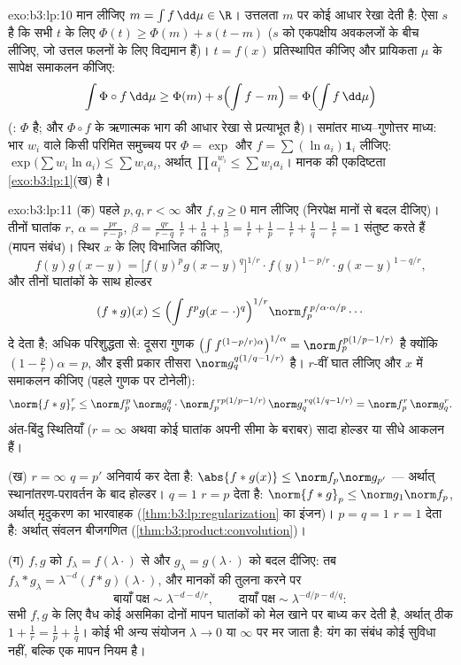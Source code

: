 \begin{solution}{exo:b3:lp:10}
मान लीजिए $m = \int f\,\dd\mu \in \R$। उत्तलता $m$ पर कोई आधार रेखा देती है: ऐसा $s$
है कि सभी $t$ के लिए $\Phi(t) \geq \Phi(m) + s(t -
m)$ ($s$ को एकपक्षीय अवकलजों के बीच लीजिए,
जो उत्तल फलनों के लिए विद्यमान हैं)। $t = f(x)$ प्रतिस्थापित कीजिए और
प्रायिकता $\mu$ के सापेक्ष समाकलन कीजिए:
\[
\int\Phi\circ f\,\dd\mu \geq \Phi(m) + s\Bigl(\int f - m\Bigr)
= \Phi\Bigl(\int f\,\dd\mu\Bigr)
\]
(: $\Phi$  है; और $\Phi\circ f$ के ऋणात्मक भाग की  आधार
रेखा से प्रत्याभूत है)। समांतर माध्य--गुणोत्तर माध्य: भार $w_i$ वाले
किसी परिमित समुच्चय पर $\Phi = \exp$ और $f = \sum(\ln a_i)\mathbf 1_i$ लीजिए: $\exp\bigl(\sum w_i\ln a_i\bigr) \leq \sum w_ia_i$, अर्थात् $\prod a_i^{w_i} \leq \sum w_ia_i$।
मानक की एकदिष्टता \cref{exo:b3:lp:1}(ख) है।
\end{solution}

\begin{solution}{exo:b3:lp:11}
(क) पहले $p, q, r < \infty$ और $f, g \geq 0$ मान लीजिए (निरपेक्ष मानों से बदल दीजिए)।
तीनों घातांक $r$, $\alpha = \frac{pr}{r-p}$, $\beta = \frac{qr}{r-q}$ $\frac1r + \frac1\alpha + \frac1\beta = \frac1r +
\frac1p - \frac1r + \frac1q - \frac1r = 1$ संतुष्ट करते हैं (मापन संबंध)।
स्थिर $x$ के लिए विभाजित कीजिए,
\[
f(y)g(x-y) = \bigl[f(y)^pg(x-y)^q\bigr]^{1/r}\cdot
f(y)^{1 - p/r}\cdot g(x-y)^{1 - q/r},
\]
और तीनों घातांकों के साथ होल्डर
\[
(f*g)(x) \leq \Bigl(\int f^pg(x-\cdot)^q\Bigr)^{1/r}
\norm f_p^{\,p/\alpha\cdot\alpha/p}\cdots
\]
दे देता है; अधिक परिशुद्धता से: दूसरा गुणक $\bigl(\int f^{(1-p/r)\alpha}\bigr)^{1/\alpha} =
\norm f_p^{p(1/p - 1/r)}$ है क्योंकि $(1 - \frac pr)\alpha = p$,
और इसी प्रकार तीसरा $\norm g_q^{q(1/q - 1/r)}$ है। $r$-वीं घात लीजिए और $x$ में समाकलन
कीजिए (पहले गुणक पर टोनेली):
\[
\norm{f*g}_r^r \leq \norm f_p^p\,\norm g_q^q\cdot
\norm f_p^{\,rp(1/p - 1/r)}\,\norm g_q^{\,rq(1/q - 1/r)}
= \norm f_p^r\,\norm g_q^r .
\]
अंत-बिंदु स्थितियाँ ($r = \infty$ अथवा कोई घातांक अपनी सीमा के बराबर) सादा
होल्डर या सीधे आकलन हैं।

(ख) $r = \infty$ $q = p'$ अनिवार्य कर देता है: $\abs{f*g(x)} \leq \norm
f_p\norm g_{p'}$ --- अर्थात् स्थानांतरण-परावर्तन
के बाद होल्डर। $q = 1$ $r = p$ देता है: $\norm{f*g}_p \leq \norm
g_1\norm f_p$, अर्थात् मृदुकरण का भारवाहक
(\cref{thm:b3:lp:regularization} का इंजन)। $p = q = 1$ $r = 1$ देता है: अर्थात् संवलन बीजगणित (\cref{thm:b3:product:convolution})।

(ग) $f, g$ को $f_\lambda = f(\lambda\cdot)$ से और $g_\lambda = g(\lambda\cdot)$ को बदल दीजिए: तब $f_\lambda*g_\lambda =
\lambda^{-d}(f*g)(\lambda\cdot)$, और मानकों
की तुलना करने पर
\[
\text{बायाँ पक्ष} \sim \lambda^{-d - d/r}, \qquad
\text{दायाँ पक्ष} \sim \lambda^{-d/p - d/q} :
\]
सभी $f, g$ के लिए वैध कोई असमिका दोनों मापन घातांकों को मेल खाने पर
बाध्य कर देती है, अर्थात् ठीक $1 + \frac1r = \frac1p + \frac1q$। कोई भी अन्य संयोजन $\lambda \to 0$ या
$\infty$ पर मर जाता है: यंग का संबंध कोई सुविधा नहीं, बल्कि एक मापन
नियम है।
\end{solution}

